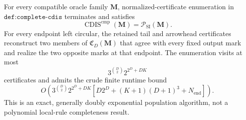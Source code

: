 For every compatible oracle family \(\mathbf M\), normalized-certificate enumeration in \(\texttt{def:complete-cdis}\) terminates and satisfies
\[
\operatorname{CDIS}^{\mathrm{cmp}}(\mathbf M)=\mathcal P_{\mathrm{SI}}(\mathbf M).
\]
For every endpoint left circular, the retained tail and arrowhead certificates reconstruct two members of \(\mathfrak C_D(\mathbf M)\) that agree with every fixed output mark and realize the two opposite marks at that endpoint.  The enumeration visits at most
\[
3^{\binom D2}2^{2^D+DK}
\]
certificates and admits the crude finite runtime bound
\[
O\!\left(3^{\binom D2}2^{2^D+DK}
\left[D2^D+(K+1)(D+1)^3+N_{\mathrm{end}}\right]\right).
\]
This is an exact, generally doubly exponential population algorithm, not a polynomial local-rule completeness result.
